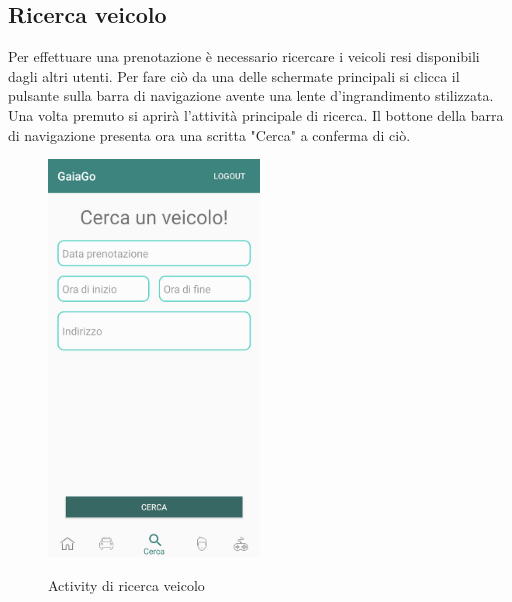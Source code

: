 \subsection{Ricerca veicolo}
\label{ricerca0}
Per effettuare una prenotazione è necessario ricercare i veicoli resi disponibili dagli altri utenti. Per fare ciò da una delle schermate principali si clicca il pulsante sulla barra di navigazione avente una lente d'ingrandimento stilizzata. Una volta premuto si aprirà l'attività principale di ricerca. Il bottone della barra di navigazione presenta ora una scritta "Cerca" a conferma di ciò.
  \begin{figure}[H] 
 	\centering 
 	\includegraphics[width=0.5\textwidth]{res/images/cerca_veicolo.png}\\
 	\caption{Activity di ricerca veicolo}
 	\label{ricerca}
 \end{figure}
\pagebreak

